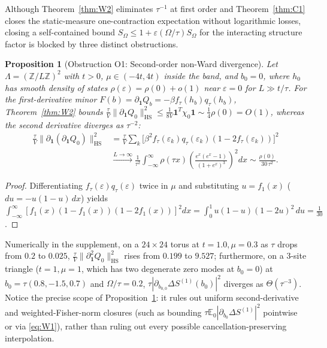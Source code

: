 \documentclass[11pt]{article}
\newtheorem{proposition}[theorem]{Proposition}
\theoremstyle{definition}
\theoremstyle{remark}
\DeclareMathOperator{\HS}{HS}
\newcommand{\E}{\mathbb{E}}
\newcommand{\Z}{\mathbb{Z}}
\begin{document}
Although Theorem~\ref{thm:W2} eliminates $\tau^{-1}$ at first order and Theorem~\ref{thm:C1} closes the static-measure one-contraction expectation without logarithmic losses, closing a self-contained bound $S_\Omega \le 1 + \varepsilon(\Omega/\tau) S_\Omega$ for the interacting structure factor is blocked by three distinct obstructions.

\begin{proposition}[Obstruction O1: Second-order non-Ward divergence]
\label{prop:O1}
Let $\Lambda = (\Z/L\Z)^2$ with $t > 0$, $\mu \in (-4t, 4t)$ inside the band, and $b_0 = 0$, where $h_0$ has smooth density of states $\rho(\varepsilon) = \rho(0) + o(1)$ near $\varepsilon = 0$ for $L \gg t/\tau$. For the first-derivative minor $F(b) = \partial_{\mathbf{1}} Q_b = -\beta f_\tau(h_b) q_\tau(h_b)$, Theorem~\ref{thm:W2} bounds $\frac{\tau}{V}\|\partial_{\mathbf{1}} Q_0\|_{\HS}^2 \le \frac{1}{8V}\mathbf{1}^T\chi_0\mathbf{1} \sim \frac{1}{4}\rho(0) = O(1)$, whereas the second derivative diverges as $\tau^{-2}$:
\begin{align}
\frac{\tau}{V}\bigl\|\partial_{\mathbf{1}}(\partial_{\mathbf{1}} Q_0)\bigr\|_{\HS}^2
&= \frac{\tau}{V} \sum_{k} \bigl[\beta^2 f_\tau(\varepsilon_k) q_\tau(\varepsilon_k)(1 - 2f_\tau(\varepsilon_k))\bigr]^2 \nonumber\\
&\xrightarrow{L\to\infty} \frac{1}{\tau^2}\int_{-\infty}^\infty \rho(\tau x) \left(\frac{e^x(e^x-1)}{(1+e^x)^3}\right)^2 dx
\sim \frac{\rho(0)}{30\,\tau^2}.
\label{eq:O1}
\end{align}
\end{proposition}

\begin{proof}
Differentiating $f_\tau(\varepsilon) q_\tau(\varepsilon)$ twice in $\mu$ and substituting $u = f_1(x)$ ($du = -u(1-u)\,dx$) yields $\int_{-\infty}^\infty [f_1(x)(1-f_1(x))(1-2f_1(x))]^2 dx = \int_0^1 u(1-u)(1-2u)^2\,du = \frac{1}{30}$.
\end{proof}

Numerically in the supplement, on a $24\times 24$ torus at $t=1.0, \mu=0.3$ as $\tau$ drops from $0.2$ to $0.025$, $\frac{\tau}{V}\|\partial_{\mathbf{1}}^2 Q_0\|_{\HS}^2$ rises from $0.199$ to $9.527$; furthermore, on a 3-site triangle ($t=1, \mu=1$, which has two degenerate zero modes at $b_0=0$) at $b_0 = \tau(0.8,-1.5,0.7)$ and $\Omega/\tau = 0.2$, $\tau|\partial_{b_{0,0}}\Delta S^{(1)}(b_0)|^2$ diverges as $\Theta(\tau^{-3})$. Notice the precise scope of Proposition~\ref{prop:O1}: it rules out uniform second-derivative and weighted-Fisher-norm closures (such as bounding $\tau\E_0|\partial_{b_0}\Delta S^{(1)}|^2$ pointwise or via \eqref{eq:W1}), rather than ruling out every possible cancellation-preserving interpolation.
\end{document}
